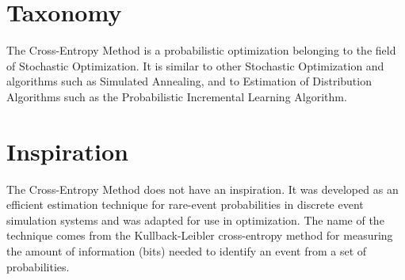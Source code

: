 \documentclass[a4paper, 11pt]{article}
\begin{document}
\section{Taxonomy}
\label{sec:taxonomy}
The Cross-Entropy Method is a probabilistic optimization belonging to the field of Stochastic Optimization.
It is similar to other Stochastic Optimization and algorithms such as Simulated Annealing, and to Estimation of Distribution Algorithms such as the Probabilistic Incremental Learning Algorithm.

\section{Inspiration}
\label{sec:inspiration}
The Cross-Entropy Method does not have an inspiration. It was developed as an efficient estimation technique for rare-event probabilities in discrete event simulation systems and was adapted for use in optimization.
The name of the technique comes from the Kullback-Leibler cross-entropy method for measuring the amount of information (bits) needed to identify an event from a set of probabilities.
\end{document}

